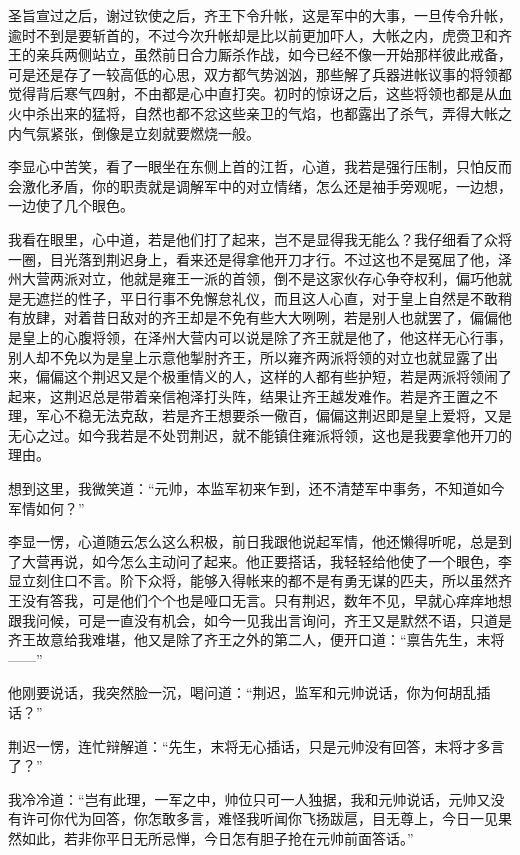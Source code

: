 圣旨宣过之后，谢过钦使之后，齐王下令升帐，这是军中的大事，一旦传令升帐，逾时不到是要斩首的，不过今次升帐却是比以前更加吓人，大帐之内，虎赍卫和齐王的亲兵两侧站立，虽然前日合力厮杀作战，如今已经不像一开始那样彼此戒备，可是还是存了一较高低的心思，双方都气势汹汹，那些解了兵器进帐议事的将领都觉得背后寒气四射，不由都是心中直打突。初时的惊讶之后，这些将领也都是从血火中杀出来的猛将，自然也都不忿这些亲卫的气焰，也都露出了杀气，弄得大帐之内气氛紧张，倒像是立刻就要燃烧一般。

李显心中苦笑，看了一眼坐在东侧上首的江哲，心道，我若是强行压制，只怕反而会激化矛盾，你的职责就是调解军中的对立情绪，怎么还是袖手旁观呢，一边想，一边使了几个眼色。

我看在眼里，心中道，若是他们打了起来，岂不是显得我无能么？我仔细看了众将一圈，目光落到荆迟身上，看来还是得拿他开刀才行。不过这也不是冤屈了他，泽州大营两派对立，他就是雍王一派的首领，倒不是这家伙存心争夺权利，偏巧他就是无遮拦的性子，平日行事不免懈怠礼仪，而且这人心直，对于皇上自然是不敢稍有放肆，对着昔日敌对的齐王却是不免有些大大咧咧，若是别人也就罢了，偏偏他是皇上的心腹将领，在泽州大营内可以说是除了齐王就是他了，他这样无心行事，别人却不免以为是皇上示意他掣肘齐王，所以雍齐两派将领的对立也就显露了出来，偏偏这个荆迟又是个极重情义的人，这样的人都有些护短，若是两派将领闹了起来，这荆迟总是带着亲信袍泽打头阵，结果让齐王越发难作。若是齐王置之不理，军心不稳无法克敌，若是齐王想要杀一儆百，偏偏这荆迟即是皇上爱将，又是无心之过。如今我若是不处罚荆迟，就不能镇住雍派将领，这也是我要拿他开刀的理由。

想到这里，我微笑道：“元帅，本监军初来乍到，还不清楚军中事务，不知道如今军情如何？”

李显一愣，心道随云怎么这么积极，前日我跟他说起军情，他还懒得听呢，总是到了大营再说，如今怎么主动问了起来。他正要搭话，我轻轻给他使了一个眼色，李显立刻住口不言。阶下众将，能够入得帐来的都不是有勇无谋的匹夫，所以虽然齐王没有答我，可是他们个个也是哑口无言。只有荆迟，数年不见，早就心痒痒地想跟我问候，可是一直没有机会，如今一见我出言询问，齐王又是默然不语，只道是齐王故意给我难堪，他又是除了齐王之外的第二人，便开口道：“禀告先生，末将——”

他刚要说话，我突然脸一沉，喝问道：“荆迟，监军和元帅说话，你为何胡乱插话？”

荆迟一愣，连忙辩解道：“先生，末将无心插话，只是元帅没有回答，末将才多言了？”

我冷冷道：“岂有此理，一军之中，帅位只可一人独据，我和元帅说话，元帅又没有许可你代为回答，你怎敢多言，难怪我听闻你飞扬跋扈，目无尊上，今日一见果然如此，若非你平日无所忌惮，今日怎有胆子抢在元帅前面答话。”

